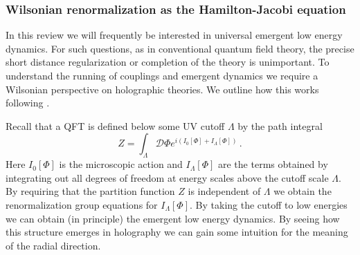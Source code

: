 \documentclass[10pt, oneside]{book}
\def\be{\begin{equation}}
\def\ee{\end{equation}}
\begin{document}
\begin{doublespace}
\subsubsection{Wilsonian renormalization as the Hamilton-Jacobi equation}

In this review we will frequently be interested in universal emergent low energy dynamics. For such questions, as in conventional quantum field theory, the precise short distance regularization or completion of the theory is unimportant. To understand the running of couplings and emergent dynamics we require a Wilsonian perspective on holographic theories. We outline how this works following \cite{Heemskerk:2010hk, Faulkner:2010jy}.

Recall that a QFT is defined below some UV cutoff $\Lambda$ by the path integral
\be\label{eq:lambda}
Z = \int_\Lambda {\mathcal D}\Phi e^{i \left(I_0[\Phi] + I_\Lambda[\Phi] \right)} \,. 
\ee
Here $I_0[\Phi]$ is the microscopic action and $I_\Lambda[\Phi]$ are the terms obtained by integrating out all degrees of freedom at energy scales above the cutoff scale $\Lambda$. By requiring that the partition function $Z$ is independent of $\Lambda$ we obtain the renormalization group equations for $I_\Lambda[\Phi]$. By taking the cutoff to low energies we can obtain (in principle) the emergent low energy dynamics. By seeing how this structure emerges in holography we can gain some intuition for the meaning of the radial direction.


\end{doublespace}
\end{document}
